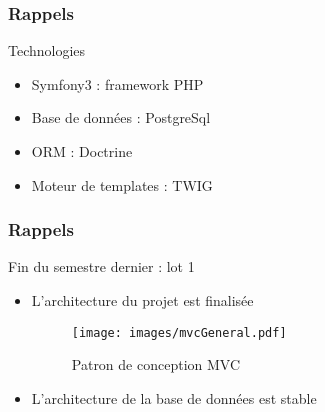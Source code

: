 \speaker{\Francois}

\begin{frame}
\frametitle{Rappels}
\begin{block}{Technologies}
	\begin{itemize}
		\item Symfony3 : framework PHP
		\item Base de données : PostgreSql
		\item ORM : Doctrine
		\item Moteur de templates : TWIG
	\end{itemize}
\end{block}
\end{frame}

\begin{frame}
\frametitle{Rappels}
\begin{block}{Fin du semestre dernier : lot 1}
	\begin{itemize}
		\item L'architecture du projet est finalisée
		\begin{figure}[!h]
			\begin{center}
				\texttt{[image: images/mvcGeneral.pdf]}
				\caption{Patron de conception MVC}
			\end{center}
		\end{figure}
		\item L'architecture de la base de données est stable
	\end{itemize}
\end{block}
\end{frame}